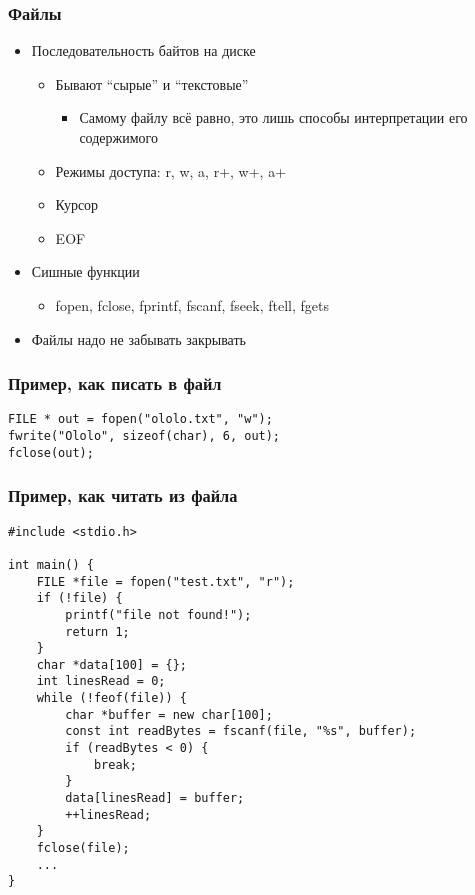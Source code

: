 \documentclass[xetex,mathserif,serif]{beamer}
\begin{document}
	\begin{frame}
		\frametitle{Файлы}
		\begin{itemize}
			\item Последовательность байтов на диске
			\begin{itemize}
				\item Бывают ``сырые'' и ``текстовые''
				\begin{itemize}
					\item Самому файлу всё равно, это лишь способы интерпретации его содержимого
				\end{itemize}
				\item Режимы доступа: r, w, a, r+, w+, a+
				\item Курсор
				\item EOF
			\end{itemize}
			\item Сишные функции
			\begin{itemize}
				\item fopen, fclose, fprintf, fscanf, fseek, ftell, fgets
			\end{itemize}
			\item Файлы надо не забывать закрывать
		\end{itemize}
	\end{frame}

	\begin{frame}[fragile]
		\frametitle{Пример, как писать в файл}
		\begin{verbatim}
FILE * out = fopen("ololo.txt", "w");
fwrite("Ololo", sizeof(char), 6, out);
fclose(out);
		\end{verbatim}
	\end{frame}

	\begin{frame}[fragile]
		\frametitle{Пример, как читать из файла}
		\begin{scriptsize}
			\begin{verbatim}
#include <stdio.h>

int main() {
    FILE *file = fopen("test.txt", "r");
    if (!file) {
        printf("file not found!");
        return 1;
    }
    char *data[100] = {};
    int linesRead = 0;
    while (!feof(file)) {
        char *buffer = new char[100];
        const int readBytes = fscanf(file, "%s", buffer);
        if (readBytes < 0) {
            break;
        }
        data[linesRead] = buffer;
        ++linesRead;
    }
    fclose(file);
    ...
}

			\end{verbatim}
		\end{scriptsize}
	\end{frame}
\end{document}
